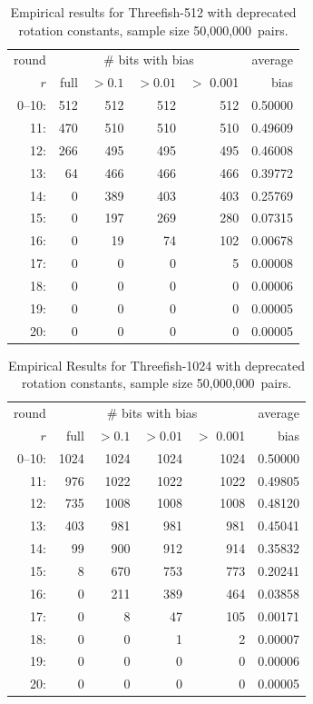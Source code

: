 \documentclass[11pt,twoside]{article}
\begin{document}
\begin{table}[tbh]
  \centering
\begin{tabular}{|r|rrrr|r|}
\hline
round & \multicolumn{ 4}{c|}{\# bits with bias} & average\\
$r$ & \quad full & $>0.1$ & $>0.01$ & $>$ 0.001 & bias \\  \hline
 0--10: &  512 &  512 &  512 &  512 & 0.50000  \\
 11: &  470 &  510 &  510 &  510 & 0.49609  \\
 12: &  266 &  495 &  495 &  495 & 0.46008  \\
 13: &  64 &  466 &  466 &  466 & 0.39772  \\
 14: &  0 &  389 &  403 &  403 & 0.25769  \\
 15: &  0 &  197 &  269 &  280 & 0.07315  \\
 16: &  0 &  19 &  74 &  102 & 0.00678  \\
 17: &  0 &  0 &  0 &  5 & 0.00008  \\
 18: &  0 &  0 &  0 &  0 & 0.00006  \\
 19: &  0 &  0 &  0 &  0 & 0.00005  \\
 20: &  0 &  0 &  0 &  0 & 0.00005  \\
\hline
\end{tabular}
\caption{Empirical results for Threefish-512 with deprecated rotation constants, sample size 50,000,000~pairs.}
\label{tab:Observations-512-Old}
\end{table}

\begin{table}[tbh]
  \centering
\begin{tabular}{|r|rrrr|r|}
\hline
round & \multicolumn{ 4}{c|}{\# bits with bias} & average\\
$r$ & \quad full & $>0.1$ & $>0.01$ & $>$ 0.001 & bias \\  \hline
 0--10: &  1024 &  1024 &  1024 &  1024 & 0.50000  \\
 11: &  976 &  1022 &  1022 &  1022 & 0.49805  \\
 12: &  735 &  1008 &  1008 &  1008 & 0.48120  \\
 13: &  403 &  981 &  981 &  981 & 0.45041  \\
 14: &  99 &  900 &  912 &  914 & 0.35832  \\
 15: &  8 &  670 &  753 &  773 & 0.20241  \\
 16: &  0 &  211 &  389 &  464 & 0.03858  \\
 17: &  0 &  8 &  47 &  105 & 0.00171  \\
 18: &  0 &  0 &  1 &  2 & 0.00007  \\
 19: &  0 &  0 &  0 &  0 & 0.00006  \\
 20: &  0 &  0 &  0 &  0 & 0.00005  \\
\hline
\end{tabular}
\caption{Empirical Results for Threefish-1024 with deprecated rotation constants, sample size 50,000,000~pairs.}
\label{tab:Observations-1024-Old}
\end{table}
\end{document}
